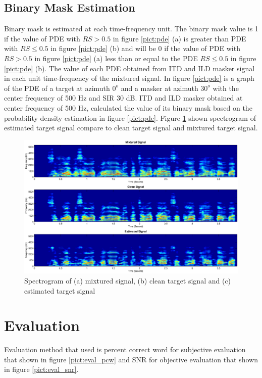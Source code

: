 \documentclass[a4paper]{jpconf}
\begin{document}
\subsection{Binary Mask Estimation}
Binary mask is estimated at each time-frequency unit. The binary mask value is 1 if the value of PDE with $RS > 0.5$ in figure \ref{pict:pde} (a) is greater than PDE with $RS \leq 0.5$ in figure \ref{pict:pde} (b) and will be 0 if the value of PDE with $RS > 0.5$ in figure \ref{pict:pde} (a) less than or equal to the PDE $RS \leq 0.5$ in figure \ref{pict:pde} (b). The value of each PDE obtained from ITD and ILD masker signal in each unit time-frequency of the mixtured signal. In figure \ref{pict:pde} is a graph of the PDE of a target at azimuth $0^o$ and a masker at azimuth $30^o$ with the center frequency of 500 Hz and SIR 30 dB. ITD and ILD masker obtained at center frequency of 500 Hz, calculated the value of its binary mask based on the probability density estimation in figure \ref{pict:pde}. Figure \ref{pict:spect_est_sig} shown spectrogram of estimated target signal compare to clean target signal and mixtured target signal.

\begin{figure}[h]
    \centering
    \includegraphics[width=7in]{pict/spectrogram_results.eps}
    \caption{\label{pict:spect_est_sig}Spectrogram of (a) mixtured signal, (b) clean target signal and (c) estimated target signal}
\end{figure} 

\section{Evaluation}
Evaluation method that used is percent correct word for subjective evaluation that shown in figure \ref{pict:eval_pcw} and SNR for objective evaluation that shown in figure \ref{pict:eval_snr}.
\end{document}
